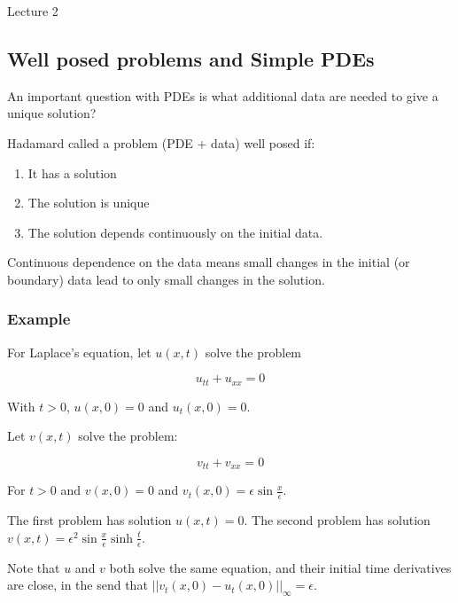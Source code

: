 \begin{center}

Lecture 2

\end{center}

\subsection{Well posed problems and Simple PDEs}

An important question with PDEs is what additional data are needed to give a unique solution?

Hadamard called a problem (PDE + data) well posed if:

\begin{enumerate}

\item It has a solution
\item The solution is unique
\item The solution depends continuously on the initial data.

\end{enumerate}

Continuous dependence on the data means small changes in the initial (or boundary) data lead to only small changes in the solution.

\subsubsection*{Example}

For Laplace's equation, let $u(x,t)$ solve the problem

$$u_{tt} + u_{xx} = 0$$

With $t > 0$, $u(x, 0) = 0$ and $u_t (x, 0) = 0$.

Let $v(x, t)$ solve the problem:

$$v_{tt} + v_{xx} = 0$$

For $t > 0$ and $v(x, 0) = 0$ and $v_t (x, 0) = \epsilon \sin \frac{x}{\epsilon}$.

\vspace{\baselineskip}

The first problem has solution $u(x,t) = 0$. The second problem has solution $v(x,t) = \epsilon^2 \sin \frac{x}{\epsilon} \sinh \frac{t}{\epsilon}$.

Note that $u$ and $v$ both solve the same equation, and their initial time derivatives are close, in the send that $|| v_t (x, 0) - u_t (x, 0) ||_{\infty} = \epsilon$. 

